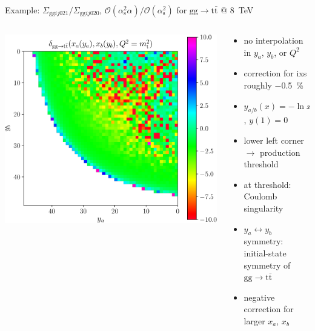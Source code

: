\begin{frame}{Example: $\Sigma_{\mathrm{gg}ij021}/\Sigma_{\mathrm{gg}ij020}$, $\mathcal{O} (\alpha_\mathrm{s}^2 \alpha) / \mathcal{O} (\alpha_\mathrm{s}^2)$ for $\mathrm{g}\mathrm{g} \to \mathrm{t} \bar{\mathrm{t}}$ @ \SI{8}{\tera\electronvolt}}
\begin{columns}[onlytextwidth]
\begin{column}{0.6\textwidth}
\includegraphics[height=0.73\textheight]{ew_corrections/figures/ttb-crop}
\end{column}
\begin{column}{0.4\textwidth}
\begin{itemize}
\item no interpolation in $y_a$, $y_b$, or $Q^2$
\item correction for ixs roughly \SI{-0.5}{\percent}
\item $y_{a/b}(x) = -\ln x_{a/b} + 5 (1-x_{a/b})$, $y(1) = 0$
\vspace*{0.25cm}
\item lower left corner $\rightarrow$ production threshold
\item at threshold: Coulomb singularity
\item $y_a \leftrightarrow y_b$ symmetry: initial-state symmetry of $\mathrm{g}\mathrm{g} \to \mathrm{t} \bar{\mathrm{t}}$
\item negative correction for larger $x_a$, $x_b$
\end{itemize}
\end{column}
\end{columns}
\end{frame}

